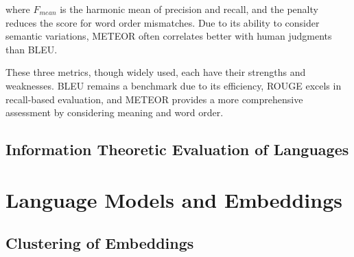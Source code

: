 where \( F_{mean} \) is the harmonic mean of precision and recall, and the penalty reduces the score for word order mismatches. Due to its ability to consider semantic variations, METEOR often correlates better with human judgments than BLEU.

These three metrics, though widely used, each have their strengths and weaknesses. BLEU remains a benchmark due to its efficiency, ROUGE excels in recall-based evaluation, and METEOR provides a more comprehensive assessment by considering meaning and word order.


\subsection{Information Theoretic Evaluation of Languages}


\section{Language Models and Embeddings}

\subsection{Clustering of Embeddings}


